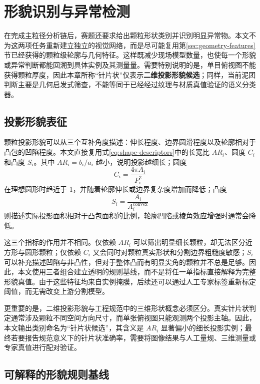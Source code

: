 \section{形貌识别与异常检测}
\label{sec:shape-anomaly}

在完成主粒径分析链后，赛题还要求给出颗粒形状类别并识别明显异常物。本文不为这两项任务重新建立独立的视觉网络，而是尽可能复用第\ref{sec:geometry-features}节已经获得的颗粒级轮廓与几何特征。这样既减少现场模型数量，也使每一个形貌或异常判断都能回溯到具体实例及其测量量。需要特别说明的是，单目俯视图不能获得颗粒厚度，因此本章所称“针片状”仅表示\textbf{二维投影形貌候选}；同样，当前泥团判断主要是几何启发式筛查，不能等同于已经经过纹理与材质真值验证的语义分类器。

\subsection{投影形貌表征}
\label{sec:projected-morphology}

颗粒投影形貌可以从三个互补角度描述：伸长程度、边界圆滑程度以及轮廓相对于凸包的凹陷程度。本文直接复用式\eqref{eq:shape-descriptors}中的长宽比 $AR_i$、圆度 $C_i$ 和凸度 $S_i$。其中 $AR_i=b_i/a_i$ 越小，说明投影越细长；圆度
\begin{equation}
 C_i=\frac{4\pi A_i}{P_i^2}
 \label{eq:morph-circularity}
\end{equation}
在理想圆形时趋近于 1，并随着轮廓伸长或边界复杂度增加而降低；凸度
\begin{equation}
 S_i=\frac{A_i}{A_i^{\mathrm{convex}}}
 \label{eq:morph-solidity}
\end{equation}
则描述实际投影面积相对于凸包面积的比例，轮廓凹陷或棱角效应增强时通常会降低。

这三个指标的作用并不相同。仅依赖 $AR_i$ 可以筛出明显细长颗粒，却无法区分近方形与圆形颗粒；仅依赖 $C_i$ 又会同时对颗粒真实形状和分割边界粗糙度敏感；$S_i$ 可以补充描述凹陷与非凸性，但对于整体凸而有明显尖角的颗粒并不总是足够。因此，本文使用三者组合建立透明的规则基线，而不是将任一单指标直接解释为完整形貌真值。由于这些特征均来自实例掩膜，后续还可以通过人工专家标签重新标定阈值，而无需改变上游分割模型。

更重要的是，二维投影形貌与工程规范中的三维形状概念必须区分。真实针片状判定通常涉及颗粒不同空间方向尺寸，而单张俯视图只能观测两个投影主轴。因此，本文输出类别命名为“针片状候选”，其含义是 $AR_i$ 显著偏小的细长投影实例；最终若要报告规范意义下的针片状准确率，需要将图像结果与人工量规、三维测量或专家真值进行配对验证。

\subsection{可解释的形貌规则基线}
\label{sec:morphology-rules}

